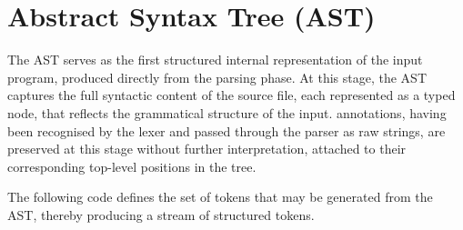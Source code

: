 \section{Abstract Syntax Tree (AST)}
\label{sec:AST}

The AST serves as the first structured internal representation of the input program, produced directly from the parsing phase. At this stage, the 
AST captures the full syntactic content of the \cml source file, each represented as a typed node, that reflects the grammatical structure of the input. 
\gospel annotations, having been recognised by the lexer and passed through the parser as raw strings, are preserved at this stage without further 
interpretation, attached to their corresponding top-level positions in the tree.

The following code defines the set of tokens that may be generated from the AST, thereby producing a stream of structured tokens.

